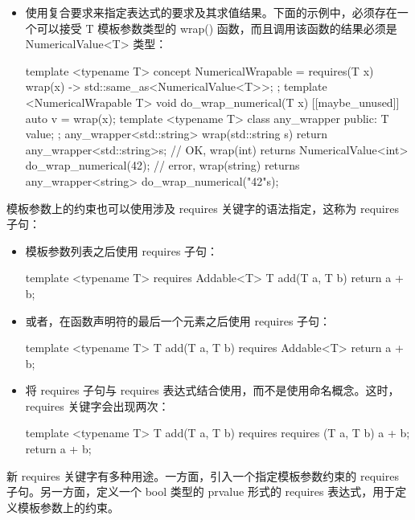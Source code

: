 \begin{itemize}
\item
使用复合要求来指定表达式的要求及其求值结果。下面的示例中，必须存在一个可以接受 T 模板参数类型的 wrap() 函数，而且调用该函数的结果必须是 NumericalValue<T> 类型：

\begin{cpp}
template <typename T>
concept NumericalWrapable =
requires(T x)
{
    {wrap(x)} -> std::same_as<NumericalValue<T>>;
};
template <NumericalWrapable T>
void do_wrap_numerical(T x)
{
    [[maybe_unused]] auto v = wrap(x);
}
template <typename T>
class any_wrapper
{
    public:
    T value;
};
any_wrapper<std::string> wrap(std::string s)
{
    return any_wrapper<std::string>{s};
}
// OK, wrap(int) returns NumericalValue<int>
do_wrap_numerical(42);
// error, wrap(string) returns any_wrapper<string>
do_wrap_numerical("42"s);
\end{cpp}
\end{itemize}

模板参数上的约束也可以使用涉及 requires 关键字的语法指定，这称为 requires 子句：

\begin{itemize}
\item
模板参数列表之后使用 requires 子句：

\begin{cpp}
template <typename T> requires Addable<T>
T add(T a, T b)
{
    return a + b;
}
\end{cpp}

\item
或者，在函数声明符的最后一个元素之后使用 requires 子句：

\begin{cpp}
template <typename T>
T add(T a, T b) requires Addable<T>
{
    return a + b;
}
\end{cpp}

\item
将 requires 子句与 requires 表达式结合使用，而不是使用命名概念。这时，requires 关键字会出现两次：

\begin{cpp}
template <typename T>
T add(T a, T b) requires requires (T a, T b) {a + b;}
{
    return a + b;
}
\end{cpp}
\end{itemize}


新 requires 关键字有多种用途。一方面，引入一个指定模板参数约束的 requires 子句。另一方面，定义一个 bool 类型的 prvalue 形式的 requires 表达式，用于定义模板参数上的约束。

